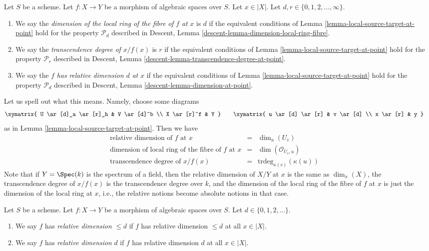 \begin{definition}
\label{definition-dimension-fibre}
Let $S$ be a scheme.
Let $f : X \to Y$ be a morphism of algebraic spaces over $S$.
Let $x \in |X|$.
Let $d, r \in \{0, 1, 2, \ldots, \infty\}$.
\begin{enumerate}
\item We say the
{\it dimension of the local ring of the fibre of $f$ at $x$} is $d$
if the equivalent conditions of
Lemma \ref{lemma-local-source-target-at-point}
hold for the property
$\mathcal{P}_d$ described in
Descent, Lemma \ref{descent-lemma-dimension-local-ring-fibre}.
\item We say the
{\it transcendence degree of $x/f(x)$} is $r$
if the equivalent conditions of
Lemma \ref{lemma-local-source-target-at-point}
hold for the property
$\mathcal{P}_r$ described in
Descent, Lemma \ref{descent-lemma-transcendence-degree-at-point}.
\item We say the
{\it $f$ has relative dimension $d$ at $x$}
if the equivalent conditions of
Lemma \ref{lemma-local-source-target-at-point}
hold for the property
$\mathcal{P}_d$ described in
Descent, Lemma \ref{descent-lemma-dimension-at-point}.
\end{enumerate}
\end{definition}

\noindent
Let us spell out what this means. Namely, choose some
diagrams
$$
\xymatrix{
U \ar[d]_a \ar[r]_h & V \ar[d]^b \\
X \ar[r]^f & Y
}
\quad\quad
\xymatrix{
u \ar[d] \ar[r] & v \ar[d] \\
x \ar[r] & y
}
$$
as in
Lemma \ref{lemma-local-source-target-at-point}.
Then we have
$$
\begin{matrix}
\text{relative dimension of }f\text{ at }x & = &
\dim_u (U_v) \\
\text{dimension of local ring of the fibre of }f\text{ at }x & = &
\dim(\mathcal{O}_{U_v, u})\\
\text{transcendence degree of }x/f(x) & = &
\text{trdeg}_{\kappa(v)}(\kappa(u))
\end{matrix}
$$
Note that if $Y = \Spec(k)$ is the spectrum of a field, then
the relative dimension of $X/Y$ at $x$ is the same as $\dim_x(X)$,
the transcendence degree of $x/f(x)$ is the transcendence degree
over $k$, and the dimension of the local ring of the fibre of $f$
at $x$ is just the dimension of the local ring at $x$, i.e., the
relative notions become absolute notions in that case.

\begin{definition}
\label{definition-relative-dimension}
Let $S$ be a scheme.
Let $f : X \to Y$ be a morphism of algebraic spaces over $S$.
Let $d \in \{0, 1, 2, \ldots\}$.
\begin{enumerate}
\item We say $f$ has {\it relative dimension $\leq d$} if
$f$ has relative dimension $\leq d$ at all $x \in |X|$.
\item We say $f$ has {\it relative dimension $d$} if
$f$ has relative dimension $d$ at all $x \in |X|$.
\end{enumerate}
\end{definition}

